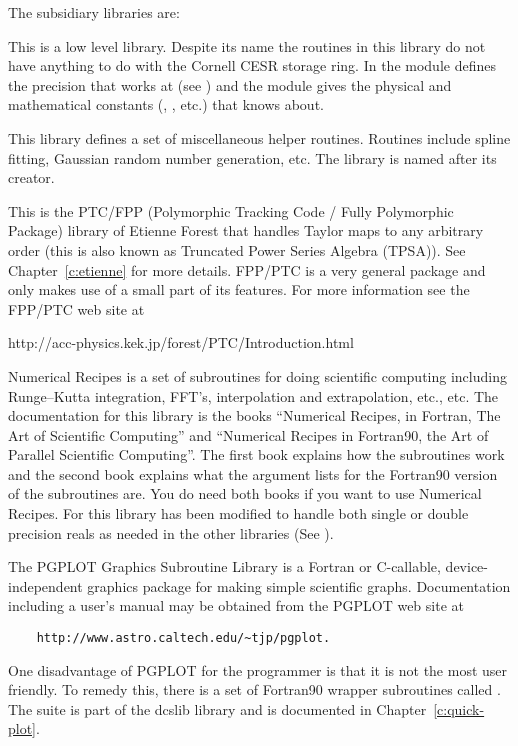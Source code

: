 The subsidiary libraries are: 
\begin{description}
\item[cesr_utils] 
This is a low level library. Despite its name the
routines in this library do not have anything to do with the Cornell
CESR storage ring.  In  the module 
defines the precision that \bmad works at (see
) and the module 
gives the physical and mathematical constants (, ,
etc.) that \bmad knows about.

\item[dcslib] 
This library defines a set of miscellaneous helper
routines.  Routines include spline fitting, Gaussian random number
generation, etc. The library is named after its creator.

\item[forest] 
This is the PTC/FPP (Polymorphic Tracking Code /
Fully Polymorphic Package) library of Etienne Forest that handles
Taylor maps to any arbitrary order (this is also known as Truncated
Power Series Algebra (TPSA)). See Chapter~\ref{c:etienne} for more
details.  FPP/PTC is a very general package and \bmad only makes use
of a small part of its features.  For more information see the FPP/PTC
web site at
\begin{example} 
   http://acc-physics.kek.jp/forest/PTC/Introduction.html
\end{example}

\item[recipes] 
Numerical Recipes is a set of subroutines for doing
scientific computing including Runge--Kutta integration, FFT's,
interpolation and extrapolation, etc., etc. The documentation for this
library is the books ``Numerical Recipes, in Fortran, The Art of
Scientific Computing'' and ``Numerical Recipes in
Fortran90, the Art of Parallel Scientific Computing''\cite{b:nr}.
The first book explains how the subroutines work and the second book
explains what the argument lists for the Fortran90 version of the
subroutines are. You do need both books if you want to use Numerical
Recipes. For \bmad this library has been modified to handle both
single or double precision reals as needed in the other libraries (See
).

\item[PGPLOT] 
The PGPLOT Graphics Subroutine Library is a Fortran or
C-callable, device-independent graphics package for making simple
scientific graphs. Documentation including a user's manual may be
obtained from the PGPLOT web site at
\begin{verbatim}
    http://www.astro.caltech.edu/~tjp/pgplot.
\end{verbatim} 
One disadvantage of PGPLOT for the programmer is that it is not the
most user friendly. To remedy this, there is a set of Fortran90
wrapper subroutines called .  The 
suite is part of the dcslib library and is documented in
Chapter~\ref{c:quick-plot}.


\end{description}
